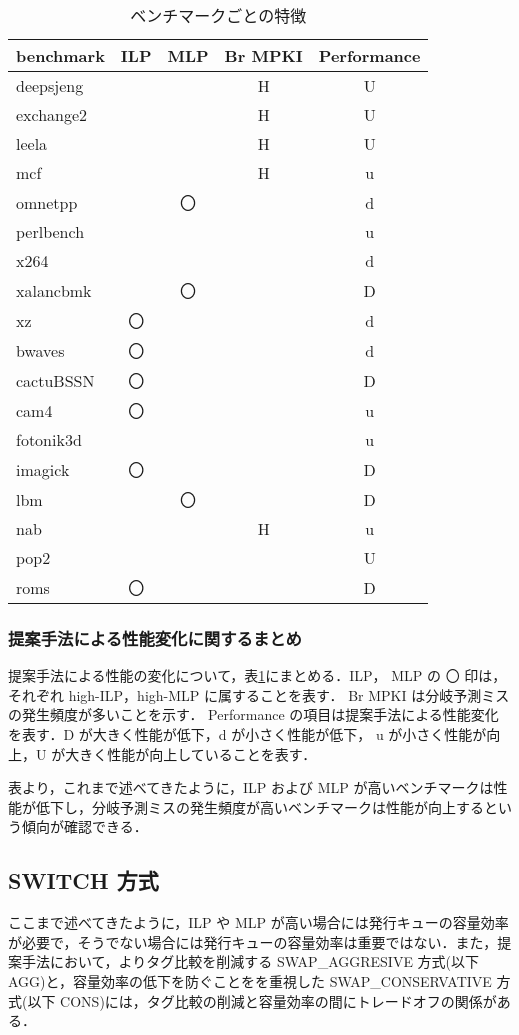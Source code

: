 \documentclass[twocolumn]{jsarticle}
\begin{document}
  \begin{table}[htb]
    \caption{ベンチマークごとの特徴}
    \footnotesize
    \center
      \begin{tabular}{l|c|c|c|c} \hline \hline
        benchmark & ILP & MLP & Br MPKI & Performance \\ \hline
        deepsjeng & & & H & U \\
        exchange2 & & & H & U \\
        leela & & & H & U \\
        mcf & & & H & u \\
        omnetpp & & 〇 & & d \\
        perlbench & & & & u \\
        x264 & & & & d \\
        xalancbmk & & 〇 & & D \\
        xz & 〇 & & & d \\
        bwaves & 〇 & & & d \\
        cactuBSSN & 〇 & & & D \\
        cam4 & 〇 & & & u \\
        fotonik3d & & & &  u \\
        imagick & 〇 & & & D \\
        lbm & & 〇 & & D \\
        nab & & & H & u \\
        pop2 & & & & U \\
        roms & 〇 & & & D \\ \hline        
      \end{tabular}
    \label{tab:bench_chara}
  \end{table}

  \subsubsection{提案手法による性能変化に関するまとめ}
    提案手法による性能の変化について，表\ref{tab:bench_chara}にまとめる．ILP， MLP の 〇 印は，それぞれ high-ILP，high-MLP に属することを表す． Br MPKI は分岐予測ミスの発生頻度が多いことを示す． Performance の項目は提案手法による性能変化を表す．D が大きく性能が低下，d が小さく性能が低下， u が小さく性能が向上，U が大きく性能が向上していることを表す．

    表より，これまで述べてきたように，ILP および MLP  が高いベンチマークは性能が低下し，分岐予測ミスの発生頻度が高いベンチマークは性能が向上するという傾向が確認できる．

  \subsection{SWITCH 方式}
  ここまで述べてきたように，ILP や MLP が高い場合には発行キューの容量効率が必要で，そうでない場合には発行キューの容量効率は重要ではない．また，提案手法において，よりタグ比較を削減する SWAP\_AGGRESIVE 方式(以下 AGG)と，容量効率の低下を防ぐことをを重視した SWAP\_CONSERVATIVE 方式(以下 CONS)には，タグ比較の削減と容量効率の間にトレードオフの関係がある．
\end{document}
